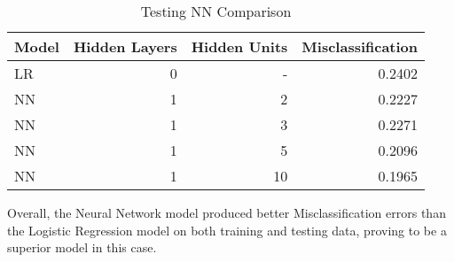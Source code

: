 \documentclass[12pt, letterpaper]{report}
\begin{document}
\begin{table}[H]
	\centering
	\begin{tabular}{ |l|r|r|r| }
		\hline
		\textbf{Model} & \textbf{Hidden Layers} & \textbf{Hidden Units} & \textbf{Misclassification} \\
		\hline
		LR & 0 & - & 0.2402 \\
		\hline
		NN & 1 & 2 & 0.2227 \\
		\hline
		NN & 1 & 3 & 0.2271 \\
		\hline
		NN & 1 & 5 & 0.2096 \\
		\hline
		NN & 1 & 10 & 0.1965 \\
		\hline
	\end{tabular}
	\caption{Testing NN Comparison}
\end{table}

Overall, the Neural Network model produced better Misclassification errors than the Logistic Regression model on both training and testing data, proving to be a superior model in this case.
\end{document}
